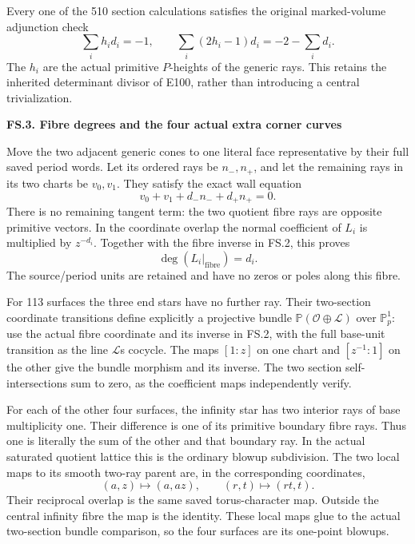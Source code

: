 Every one of the 510 section calculations
satisfies the original marked-volume
adjunction check
\[
 \sum_i h_i d_i=-1,\qquad
 \sum_i(2h_i-1)d_i=-2-\sum_i d_i.                          \tag{FS.6}
\]
The \(h_i\) are the actual primitive
\(P\)-heights of the generic rays.
This retains the inherited determinant
divisor of E100, rather than introducing
a central trivialization.

\par

\medskip\noindent\textbf{FS.3. Fibre degrees and the four actual extra corner curves}

\par\nobreak

Move the two adjacent generic cones to one
literal face representative by their full
saved period words. Let its ordered rays
be \(n_-,n_+\), and let the remaining
rays in its two charts be \(v_0,v_1\).
They satisfy the exact wall equation
\[
 v_0+v_1+d_-n_-+d_+n_+=0.                                \tag{FS.7}
\]
There is no remaining tangent term:
the two quotient fibre rays are opposite
primitive vectors. In the coordinate
overlap the normal coefficient of \(L_i\)
is multiplied by \(z^{-d_i}\).
Together with the fibre inverse in FS.2,
this proves
\[
 \deg(L_i|_{\text{fibre}})=d_i.                            \tag{FS.8}
\]
The source/period units are retained and
have no zeros or poles along this fibre.

For 113 surfaces the three end stars
have no further ray. Their two-section
coordinate transitions define explicitly
a projective bundle
\(\mathbb P(\mathcal O\oplus\mathcal L)\)
over \(\mathbb P^1_p\): use the actual
fibre coordinate and its inverse in
FS.2, with the full base-unit transition
as the line \(\mathcal L\)\textquotesingle s cocycle.
The maps \([1:z]\) on one chart and
\([z^{-1}:1]\) on the other give the
bundle morphism and its inverse.
The two section self-intersections
sum to zero, as the coefficient maps
independently verify.

For each of the other four surfaces,
the infinity star has two interior rays
of base multiplicity one. Their difference
is one of its primitive boundary fibre
rays. Thus one is literally the sum of
the other and that boundary ray. In the
actual saturated quotient lattice this
is the ordinary blowup subdivision.
The two local maps to its smooth
two-ray parent are, in the corresponding
coordinates,
\[
 (a,z)\longmapsto(a,az),\qquad
 (r,t)\longmapsto(rt,t).                                  \tag{FS.9}
\]
Their reciprocal overlap is the same
saved torus-character map. Outside
the central infinity fibre the map is
the identity. These local maps glue
to the actual two-section bundle
comparison, so the four surfaces are
its one-point blowups.

